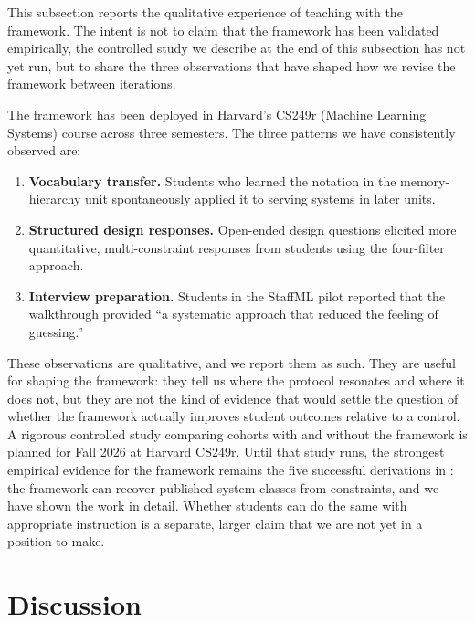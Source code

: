 \documentclass[10pt,twocolumn]{article}
\begin{document}
This subsection reports the qualitative experience of teaching with the framework. The intent is not to claim that the framework has been validated empirically, the controlled study we describe at the end of this subsection has not yet run, but to share the three observations that have shaped how we revise the framework between iterations.

The framework has been deployed in Harvard's CS249r (Machine Learning Systems) course across three semesters. The three patterns we have consistently observed are:

\begin{enumerate}[nosep, leftmargin=*]
\item \textbf{Vocabulary transfer.} Students who learned the notation in the memory-hierarchy unit spontaneously applied it to serving systems in later units.

\item \textbf{Structured design responses.} Open-ended design questions elicited more quantitative, multi-constraint responses from students using the four-filter approach.

\item \textbf{Interview preparation.} Students in the StaffML pilot reported that the walkthrough provided ``a systematic approach that reduced the feeling of guessing.''
\end{enumerate}

These observations are qualitative, and we report them as such. They are useful for shaping the framework: they tell us where the protocol resonates and where it does not, but they are not the kind of evidence that would settle the question of whether the framework actually improves student outcomes relative to a control. A rigorous controlled study comparing cohorts with and without the framework is planned for Fall 2026 at Harvard CS249r. Until that study runs, the strongest empirical evidence for the framework remains the five successful derivations in : the framework can recover published system classes from constraints, and we have shown the work in detail. Whether students can do the same with appropriate instruction is a separate, larger claim that we are not yet in a position to make.

\section{Discussion}
\label{sec:conclusion}
\end{document}
